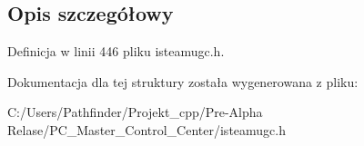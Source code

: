 \subsection{Opis szczegółowy}


Definicja w linii 446 pliku isteamugc.\+h.



Dokumentacja dla tej struktury została wygenerowana z pliku\+:\begin{DoxyCompactItemize}
\item 
C\+:/\+Users/\+Pathfinder/\+Projekt\+\_\+cpp/\+Pre-\/\+Alpha Relase/\+P\+C\+\_\+\+Master\+\_\+\+Control\+\_\+\+Center/isteamugc.\+h\end{DoxyCompactItemize}
